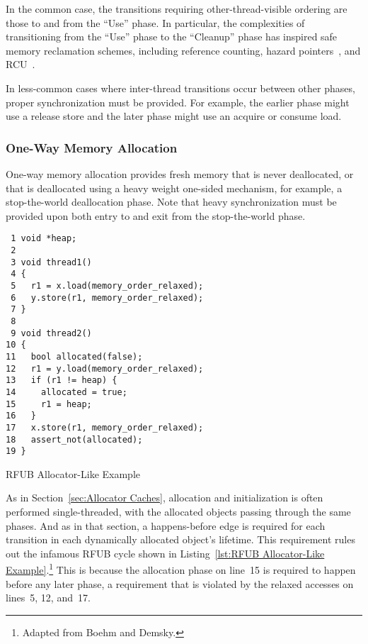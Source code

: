 \documentclass[10]{article}
\begin{document}
In the common case, the transitions requiring other-thread-visible ordering
are those to and from the ``Use'' phase.
In particular, the complexities of transitioning from the ``Use'' phase
to the ``Cleanup'' phase has inspired safe memory reclamation schemes,
including reference counting,
hazard pointers~\cite{Michael02a,HerlihyLM02,MagedMichael04a},
and RCU~\cite{McKenney98}.

In less-common cases where inter-thread transitions occur between other
phases, proper synchronization must be provided.
For example, the earlier phase might use a release store and
the later phase might use an acquire or consume load.

\subsubsection{One-Way Memory Allocation}
\label{sec:One-Way Memory Allocation}

One-way memory allocation provides fresh memory that is never deallocated,
or that is deallocated using a heavy weight one-sided mechanism, for
example, a stop-the-world deallocation phase.
Note that heavy synchronization must be provided upon both entry to and
exit from the stop-the-world phase.

\begin{listing}[tbp]
\begin{verbatim}
 1 void *heap;
 2
 3 void thread1()
 4 {
 5   r1 = x.load(memory_order_relaxed);
 6   y.store(r1, memory_order_relaxed);
 7 }
 8
 9 void thread2()
10 {
11   bool allocated(false);
12   r1 = y.load(memory_order_relaxed);
13   if (r1 != heap) {
14     allocated = true;
15     r1 = heap;
16   }
17   x.store(r1, memory_order_relaxed);
18   assert_not(allocated);
19 }
\end{verbatim}
\caption{RFUB Allocator-Like Example}
\label{lst:RFUB Allocator-Like Example}
\end{listing}

As in
Section~\ref{sec:Allocator Caches},
allocation and initialization is often performed single-threaded,
with the allocated objects passing through the same phases.
And as in that section, a happens-before edge is required for each
transition in each dynamically allocated object's lifetime.
This requirement rules out the infamous RFUB cycle shown in
Listing~\ref{lst:RFUB Allocator-Like Example}.\footnote{
	Adapted from Boehm and
	Demsky\cite[Figure 5]{Boehm:2014:OGA:2618128.2618134}.}
This is because the allocation phase on line~15 is required to happen
before any later phase, a requirement that is violated by the relaxed
accesses on lines~5, 12, and~17.
\end{document}

